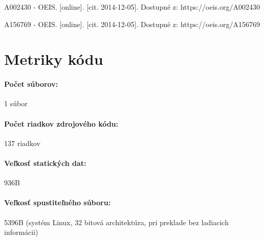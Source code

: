 \documentclass[12pt,a4paper,titlepage,final]{article}
\begin{document}
\begin{thebibliography}{2}

A002430 - OEIS. [online]. [cit. 2014-12-05]. Dostupné z: https://oeis.org/A002430

A156769 - OEIS. [online]. [cit. 2014-12-05]. Dostupné z: https://oeis.org/A156769

\end{thebibliography}
\appendix

\section{Metriky kódu} \label{metriky}
\paragraph{Počet súborov:} 1 súbor
\paragraph{Počet riadkov zdrojového kódu:} 137 riadkov
\paragraph{Veľkosť statických dat:} 936B
\paragraph{Veľkosť spustiteľného súboru:} 5396B (systém Linux, 32 bitová
architektúra, pri preklade bez ladiacich informácii)
\end{document}
